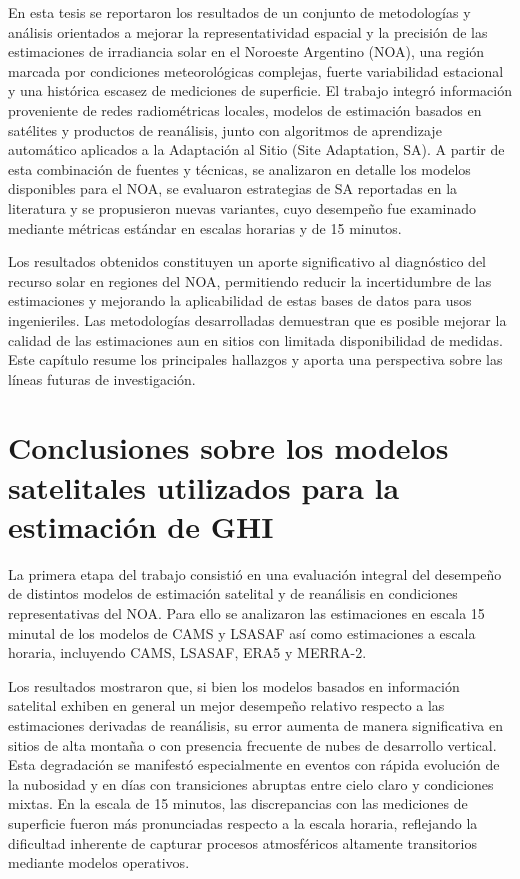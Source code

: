 \documentclass[letterpaper,12pt, twoside]{report}
\providecommand{\DIFdeltex}[1]{{\protect\color{red} \scriptsize #1}} %
\providecommand{\DIFdel}[1]{\texorpdfstring{\DIFdeltex{#1}}{}} %
\begin{document}
\DIFdel{En esta tesis se reportaron los resultados de un conjunto de metodologías y análisis orientados a mejorar la representatividad espacial y la precisión de las estimaciones de irradiancia solar en el Noroeste Argentino (NOA), una región marcada por condiciones meteorológicas complejas, fuerte variabilidad estacional y una histórica escasez de mediciones de superficie. El trabajo integró información proveniente de redes radiométricas locales, modelos de estimación basados en satélites y productos de reanálisis, junto con algoritmos de aprendizaje automático aplicados a la Adaptación al Sitio (Site Adaptation, SA). A partir de esta combinación de fuentes y técnicas, se analizaron en detalle los modelos disponibles para el NOA, se evaluaron estrategias de SA reportadas en la literatura y se propusieron nuevas variantes, cuyo desempeño fue examinado mediante métricas estándar en escalas horarias y de 15 minutos.
}%

\DIFdel{Los resultados obtenidos constituyen un aporte significativo al diagnóstico del recurso solar en regiones del NOA, permitiendo reducir la incertidumbre de las estimaciones y mejorando la aplicabilidad de estas bases de datos para usos ingenieriles. Las metodologías desarrolladas demuestran que es posible mejorar la calidad de las estimaciones aun en sitios con limitada disponibilidad de medidas. Este capítulo resume los principales hallazgos y aporta una perspectiva sobre las líneas futuras de investigación.
}%

\section{\DIFdel{Conclusiones sobre los modelos satelitales utilizados para la estimación de GHI}}
\addtocounter{section}{-1}%
\DIFdel{La primera etapa del trabajo consistió en una evaluación integral del desempeño de distintos modelos de estimación satelital y de reanálisis en condiciones representativas del NOA. Para ello se analizaron las estimaciones en escala 15 minutal de los modelos de CAMS y LSASAF así como estimaciones a escala horaria, incluyendo CAMS, LSASAF, ERA5 y MERRA-2.
}%

\DIFdel{Los resultados mostraron que, si bien los modelos basados en información satelital exhiben en general un mejor desempeño relativo respecto a las estimaciones derivadas de reanálisis, su error aumenta de manera significativa en sitios de alta montaña o con presencia frecuente de nubes de desarrollo vertical. Esta degradación se manifestó especialmente en eventos con rápida evolución de la nubosidad y en días con transiciones abruptas entre cielo claro y condiciones mixtas. En la escala de 15 minutos, las discrepancias con las mediciones de superficie fueron más pronunciadas respecto a la escala horaria, reflejando la dificultad inherente de capturar procesos atmosféricos altamente transitorios mediante modelos operativos.
}%
\end{document}
